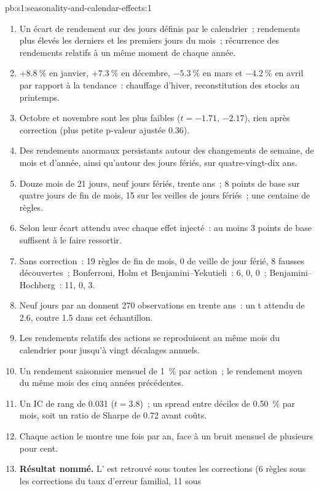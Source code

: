 \begin{solution}{pb:s1:seasonality-and-calendar-effects:1}
\begin{enumerate}
\item Un écart de rendement sur des jours définis par le calendrier~; rendements plus élevés les derniers et les premiers jours du mois~; récurrence des rendements relatifs à un même
moment de chaque année.
\item $+8.8~\%$ en janvier, $+7.3~\%$ en décembre, $-5.3~\%$ en mars et $-4.2~\%$ en avril par rapport à la tendance~: chauffage d'hiver, reconstitution des stocks au printemps.
\item Octobre et novembre sont les plus faibles ($t = -1.71$, $-2.17$), rien après correction (plus petite p-valeur ajustée 0.36).
\item Des rendements anormaux persistants autour des changements de semaine, de mois et d'année, ainsi qu'autour des jours fériés, sur quatre-vingt-dix ans.
\item Douze mois de 21 jours, neuf jours fériés, trente ans~; 8 points de base sur quatre jours de fin de mois, 15 sur les veilles de jours fériés~; une centaine de règles.
\item Selon leur écart attendu avec chaque effet injecté~: au moins 3 points de base suffisent à le faire ressortir.
\item Sans correction~: 19 règles de fin de mois, 0 de veille de jour férié, 8 fausses découvertes~; Bonferroni, Holm et Benjamini--Yekutieli~: 6, 0, 0~; Benjamini--Hochberg~: 11, 0, 3.
\item Neuf jours par an donnent 270 observations en trente ans~: un t attendu de 2.6, contre 1.5 dans cet échantillon.
\item Les rendements relatifs des actions se reproduisent au même mois du calendrier pour jusqu'à vingt décalages annuels.
\item Un rendement saisonnier mensuel de 1~\% par action~; le rendement moyen du même mois des cinq années précédentes.
\item Un IC de rang de 0.031 ($t = 3.8$)~; un spread entre déciles de 0.50~\% par mois, soit un ratio de Sharpe de 0.72 avant coûts.
\item Chaque action le montre une fois par an, face à un bruit mensuel de plusieurs pour cent.
\item \textbf{Résultat nommé.} L' est retrouvé sous toutes les corrections (6 règles sous les corrections du taux d'erreur familial, 11 sous

\end{enumerate}
\end{solution}
